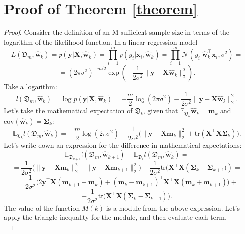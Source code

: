 \documentclass[runningheads]{llncs}
\begin{document}
\clearpage
\appendix

\section{Proof of Theorem \ref{theorem}}

\begin{proof}
Consider the definition of an M-sufficient sample size in terms of the logarithm of the likelihood function. In a linear regression model
    \[ L\left( \mathfrak{D}_m, \hat{\mathbf{w}}_k \right) = p(\mathbf{y} | \mathbf{X}, \hat{\mathbf{w}}_k) = \prod_{i=1}^{m} p(y_i | \mathbf{x}_i, \hat{\mathbf{w}}_k) = \prod_{i=1}^{m} \mathcal{N}\left( y_i | \hat{\mathbf{w}}_k^{\top} \mathbf{x}_i, \sigma^2 \right) = \]
    \[= \left(2\pi\sigma^2 \right)^{-m/2} \exp\left(-\dfrac{1}{2\sigma^2}\|\mathbf{y} -\mathbf{X} \hat{\mathbf{w}}_k\|_2^2 \right). \]
Take a logarithm:
    \[ l\left( \mathfrak{D}_m, \hat{\mathbf{w}}_k \right) = \log p(\mathbf{y} | \mathbf{X}, \hat{\mathbf{w}}_k) = -\dfrac{m}{2}\log\left( 2\pi\sigma^2 \right) - \dfrac{1}{2\sigma^2} \| \mathbf{y} - \mathbf{X} \hat{\mathbf{w}}_k \|_2^2. \]
Let's take the mathematical expectation of $\mathfrak{D}_k$, given that $\mathbb{E}_{\mathfrak{D}_k}\hat{\mathbf{w}}_k=\mathbf{m}_k$ and $\text{cov}(\hat{\mathbf{w}}_k) = \mathbf{\Sigma}_k$:
    \[ \mathbb{E}_{\mathfrak{D}_k} l\left( \mathfrak{D}_m, \hat{\mathbf{w}}_k \right) = -\dfrac{m}{2}\log\left( 2\pi\sigma^2 \right) - \dfrac{1}{2\sigma^2} \Big( \| \mathbf{y} - \mathbf{X} \mathbf{m}_k \|_2^2 + \text{tr}\left( \mathbf{X}^{\top}\mathbf{X} \mathbf{\Sigma}_k \right) \Big). \]
    Let's write down an expression for the difference in mathematical expectations:
    \[ \mathbb{E}_{\mathfrak{D}_{k+1}} l(\mathfrak{D}_m, \hat{\mathbf{w}}_{k+1}) - \mathbb{E}_{\mathfrak{D}_k} l(\mathfrak{D}_m, \hat{\mathbf{w}}_{k}) = \]
    \[ = \dfrac{1}{2\sigma^2} \Big( \| \mathbf{y} - \mathbf{X} \mathbf{m}_k \|_2^2 - \| \mathbf{y} - \mathbf{X} \mathbf{m}_{k+1} \|_2^2 \Big) + \dfrac{1}{2\sigma^2} \text{tr} \Big( \mathbf{X}^{\top}\mathbf{X} \left( \mathbf{\Sigma}_k - \mathbf{\Sigma}_{k+1} \Big) \right) = \]
    \[ = \dfrac{1}{2\sigma^2} \Big( 2 \mathbf{y}^{\top} \mathbf{X} (\mathbf{m}_{k+1} - \mathbf{m}_k) + (\mathbf{m}_k - \mathbf{m}_{k+1})^{\top} \mathbf{X}^{\top}\mathbf{X} (\mathbf{m}_k + \mathbf{m}_{k+1}) \Big) + \]
    \[ + \dfrac{1}{2\sigma^2} \text{tr} \Big( \mathbf{X}^{\top}\mathbf{X} \left( \mathbf{\Sigma}_k - \mathbf{\Sigma}_{k+1} \right) \Big). \]
The value of the function $M(k)$ is a module from the above expression. Let's apply the triangle inequality for the module, and then evaluate each term.\\

\end{proof}
\end{document}

